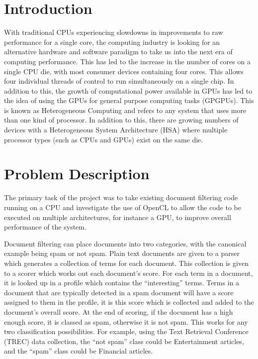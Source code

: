 \section{Introduction}

With traditional CPUs experiencing slowdowns in improvements to raw performance
for a single core, the computing industry is looking for an alternative hardware
and software paradigm to take us into the next era of computing performance.
This has led to the increase in the number of cores on a single CPU die, with
most consumer devices containing four cores. This allows four individual threads
of control to run simultaneously on a single chip. In addition to this, the
growth of computational power available in GPUs has led to the idea of using the
GPUs for general purpose computing tasks (GPGPUs). This is known as
Heterogeneous Computing and refers to any system that uses more than one kind of
processor. In addition to this, there are growing numbers of devices with a
Heterogeneous System Architecture (HSA) where multiple processor types (such as
CPUs and GPUs) exist on the same die.

\section{Problem Description}

The primary task of the project was to take existing document filtering code
running on a CPU and investigate the use of OpenCL to allow the code to be
executed on multiple architectures, for instance a GPU, to improve overall
performance of the system.

Document filtering can place documents into two categories, with the canonical
example being spam or not spam. Plain text documents are given to a parser which
generates a collection of terms for each document. This collection is given to a
scorer which works out each document's score. For each term in a document, it is
looked up in a profile which contains the ``interesting'' terms. Terms in a
document that are typically detected in a spam document will have a score
assigned to them in the profile, it is this score which is collected and added
to the document's overall score. At the end of scoring, if the document has a
high enough score, it is classed as spam, otherwise it is not spam. This works
for any two classification possibilities. For example, using the Text Retrieval
Conference (TREC) data collection, the ``not spam'' class could be Entertainment
articles, and the ``spam'' class could be Financial articles.

